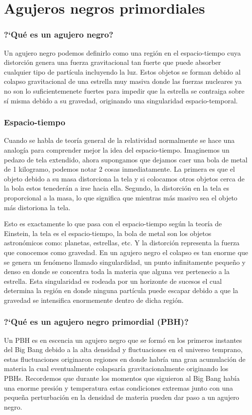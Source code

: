 \documentclass{article}
\begin{document}
\section*{Agujeros negros primordiales}
\subsubsection*{?`Qu\'e es un agujero negro?}
Un agujero negro podemos definirlo como una regi\'on en el espacio-tiempo cuya distorci\'on genera una fuerza gravitacional tan fuerte que puede absorber cualquier tipo de part\'icula incluyendo la luz. 
Estos objetos se forman debido al colapso gravitacional de una estrella muy masiva donde las fuerzas nucleares ya no son lo suficientemenete fuertes para impedir que la estrella se contraiga sobre s\'i misma debido a su gravedad, originando una singularidad espacio-temporal.
\subsubsection*{Espacio-tiempo}
Cuando se habla de teor\'ia general de la relatividad normalmente se hace una analog\'ia para comprender mejor la idea del espacio-tiempo. Imaginemos un pedazo de tela extendido, ahora supongamos que dejamos caer una bola de metal de 1 kilogramo, podemos notar 2 cosas inmediatamente. La primera es que el objeto debido a su masa distorciona la tela y si colocamos otros objetos cerca de la bola estos teneder\'an a irse hacia ella. Segundo, la distorci\'on en la tela es proporcional a la masa, lo que significa que mientras m\'as masivo sea el objeto m\'as distoriona la tela.

Esto es exactamente lo que pasa con el espacio-tiempo seg\'un la teor\'ia de Einstein, la tela es el espacio-tiempo, la bola de metal son los objetos astron\'omicos como: planetas, estrellas, etc. Y la distorci\'on representa la fuerza que conocemos como gravedad.
En un agujero negro el colapso es tan enorme que se genera un fen\'omeno llamado singulardidad, un punto infinitamente peque\~{n}o y denso en donde se concentra toda la materia que alguna vez pertenecio a la estrella.
Esta singularidad es rodeada por un horizonte de sucesos el cual determina la regi\'on en donde ninguna part\'icula puede escapar debido a que la gravedad se intensifica enormemente dentro de dicha regi\'on.

\subsubsection*{?`Qu\'e es un agujero negro primordial (PBH)?}
Un PBH es en escencia un agujero negro que se form\'o en los primeros instantes del Big Bang debido a la alta densidad y fluctuaciones en el universo temprano, estas fluctuaciones originaron regiones en donde habr\'ia una gran acumulaci\'on de materia la cual eventualmente colapsar\'ia gravitacionalmente originando los PBHs. Recordemos que durante los momentos que siguieron al Big Bang hab\'ia una enorme presi\'on y temperatura estas condiciones extremas junto con una peque\~{n}a perturbaci\'on en la densidad de materia pueden dar paso a un agujero negro.
\end{document}
